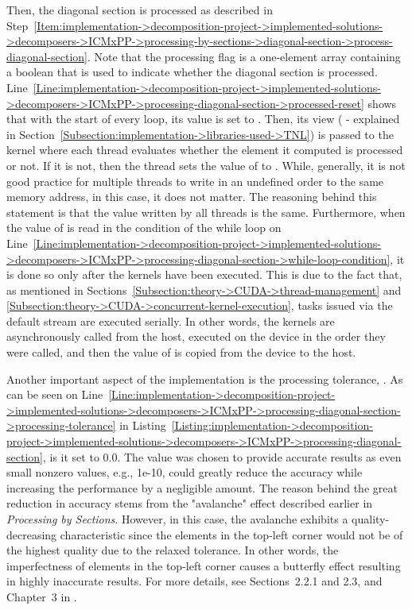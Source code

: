 Then, the diagonal section is processed as described in Step~\ref{Item:implementation->decomposition-project->implemented-solutions->decomposers->ICMxPP->processing-by-sections->diagonal-section->process-diagonal-section}. Note that the processing flag  is a one-element array containing a boolean that is used to indicate whether the diagonal section is processed. Line~\ref{Line:implementation->decomposition-project->implemented-solutions->decomposers->ICMxPP->processing-diagonal-section->processed-reset} shows that with the start of every loop, its value is set to . Then, its view ( - explained in Section~\ref{Subsection:implementation->libraries-used->TNL}) is passed to the kernel where each thread evaluates whether the element it computed is processed or not. If it is not, then the thread sets the value of  to . While, generally, it is not good practice for multiple threads to write in an undefined order to the same memory address, in this case, it does not matter. The reasoning behind this statement is that the value written by all threads is the same. Furthermore, when the value of  is read in the condition of the while loop on Line~\ref{Line:implementation->decomposition-project->implemented-solutions->decomposers->ICMxPP->processing-diagonal-section->while-loop-condition}, it is done so only after the kernels have been executed. This is due to the fact that, as mentioned in Sections~\ref{Subsection:theory->CUDA->thread-management} and \ref{Subsection:theory->CUDA->concurrent-kernel-execution}, tasks issued via the default stream are executed serially. In other words, the kernels are asynchronously called from the host, executed on the device in the order they were called, and then the value of  is copied from the device to the host.

Another important aspect of the implementation is the processing tolerance, . As can be seen on Line~\ref{Line:implementation->decomposition-project->implemented-solutions->decomposers->ICMxPP->processing-diagonal-section->processing-tolerance} in Listing~\ref{Listing:implementation->decomposition-project->implemented-solutions->decomposers->ICMxPP->processing-diagonal-section}, is it set to 0.0. The value was chosen to provide accurate results as even small nonzero values, e.g., 1e-10, could greatly reduce the accuracy while increasing the performance by a negligible amount. The reason behind the great reduction in accuracy stems from the "avalanche" effect described earlier in \textit{Processing by Sections}. However, in this case, the avalanche exhibits a quality-decreasing characteristic since the elements in the top-left corner would not be of the highest quality due to the relaxed tolerance. In other words, the imperfectness of elements in the top-left corner causes a butterfly effect resulting in highly inaccurate results. For more details, see Sections~2.2.1 and 2.3, and Chapter~3 in  \cite{Cejka2022}.

